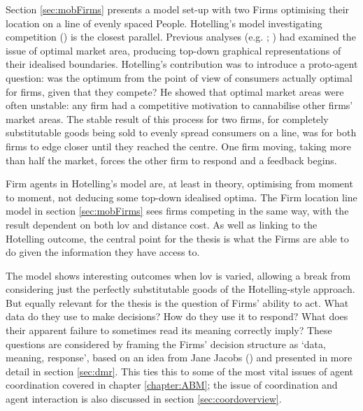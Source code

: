 Section \ref{sec:mobFirms} presents a model set-up with two Firms optimising their location on a line of evenly spaced People. Hotelling's model investigating competition (\citealt{ hotelling_stability_1929}) is the closest parallel. Previous analyses (e.g. \citealt{palander_contributions_1935}; \citealt{hoover_location_1937}) had examined the issue of optimal market area, producing top-down graphical representations of their idealised boundaries. Hotelling's contribution was to introduce a proto-agent question: was the optimum from the point of view of consumers actually optimal for firms, given that they compete? He showed that optimal market areas were often unstable: any firm had a competitive motivation to cannabilise other firms' market areas. The stable result of this process for two firms, for completely substitutable goods being sold to evenly spread consumers on a line, was for both firms to edge closer until they reached the centre.  One firm moving, taking more than half the market, forces the other firm to respond and a feedback begins. 

Firm agents in Hotelling's model are, at least in theory, optimising from moment to moment, not deducing some top-down idealised optima. The Firm location line model in section \ref{sec:mobFirms} sees firms competing in the same way, with the result dependent on both \gls{lov} and distance cost. As well as linking to the Hotelling outcome, the central point for the thesis is what the Firms are able to do given the information they have access to. 

The model shows interesting outcomes when \gls{lov} is varied, allowing a break from considering just the perfectly substitutable goods of the Hotelling-style approach. But equally relevant for the thesis is the question of Firms' ability to act. What data do they use to make decisions? How do they use it to respond? What does their apparent failure to sometimes read its meaning correctly imply? These questions are considered by framing the Firms' decision structure as `data, meaning, response', based on an idea from Jane Jacobs (\citealt{jacobs_nature_2001}) and presented in more detail in section \ref{sec:dmr}. This ties this to some of the most vital issues of agent coordination covered in chapter \ref{chapter:ABM}; the issue of coordination and agent interaction is also discussed in section \ref{sec:coordoverview}.

